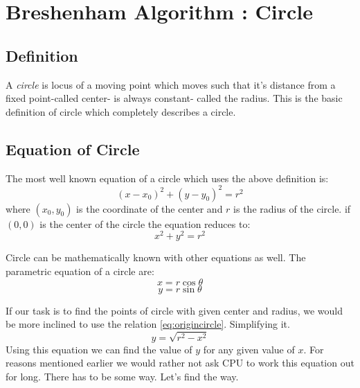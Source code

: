 \documentclass[a4paper,12pt,oneside]{book}
\begin{document}
\chapter{Breshenham Algorithm : Circle}
\section{Definition}

 A \emph{circle} is locus of a moving point which moves such that it's distance from a fixed point-called center- is always constant- called the radius. This is the basic definition of circle which completely describes a circle. 
\section{Equation of Circle}
The most well known equation of a circle which uses the above definition is:
\begin{equation} \label{eq:generalcircle}
	(x-x_0)^2+(y-y_0)^2=r^2
\end{equation}
where $(x_0,y_0)$ is the coordinate of the center and $r$ is the radius of the circle. if $(0,0)$ is the center of the circle the equation reduces to:
\begin{equation} \label{eq:origincircle}
	x^2+y^2=r^2
\end{equation} 

Circle can be mathematically known with other equations as well. The parametric equation of a circle are:
\begin{equation}
	x=r\cos\theta
\end{equation}
\begin{equation}
	y=r\sin\theta
\end{equation}

If our task is to find the points of circle with given center and radius, we would be more inclined to use the relation \ref{eq:origincircle}. Simplifying it.
\begin{equation}
	y=\sqrt{r^2-x^2}
\end{equation}
 Using this equation we can find the value of $y$ for any given value of $x$. For reasons mentioned earlier we would rather not ask CPU to work this equation out for long. There has to be some way. Let's find the way.
\end{document}
